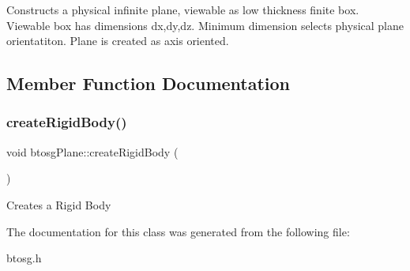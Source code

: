 Constructs a physical infinite plane, viewable as low thickness finite box. Viewable box has dimensions dx,dy,dz. Minimum dimension selects physical plane orientatiton. Plane is created as axis oriented. 

\subsection{Member Function Documentation}
\mbox{\label{classbtosgPlane_a0e6812c186ed1fa128dccf7cd2e525a6}} 
\subsubsection{\texorpdfstring{create\+Rigid\+Body()}{createRigidBody()}}
{\footnotesize\ttfamily void btosg\+Plane\+::create\+Rigid\+Body (\begin{DoxyParamCaption}{ }\end{DoxyParamCaption})\hspace{0.3cm}{\ttfamily [inline]}}

Creates a Rigid Body 

The documentation for this class was generated from the following file\+:\begin{DoxyCompactItemize}
\item 
btosg.\+h\end{DoxyCompactItemize}

